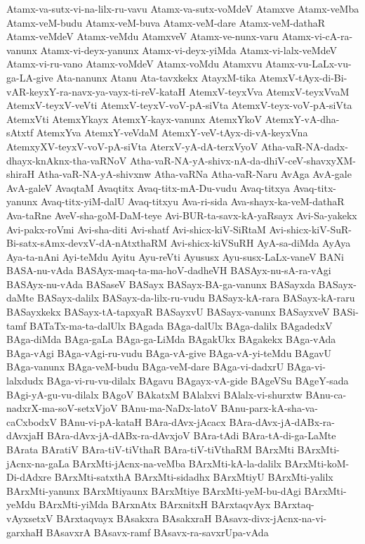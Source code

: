 {Atamx-va-sutx-vi-na-lilx-ru-vavu
Atamx-va-sutx-voMdeV
Atamxve
Atamx-veMba
Atamx-veM-budu
Atamx-veM-buva
Atamx-veM-dare
Atamx-veM-dathaR
Atamx-veMdeV
Atamx-veMdu
AtamxveV
Atamx-ve-nunx-varu
Atamx-vi-cA-ra-vanunx
Atamx-vi-deyx-yanunx
Atamx-vi-deyx-yiMda
Atamx-vi-lalx-veMdeV
Atamx-vi-ru-vano
Atamx-voMdeV
Atamx-voMdu
Atamxvu
Atamx-vu-LaLx-vu-ga-LA-give
Ata-nanunx
Atanu
Ata-tavxkekx
AtayxM-tika
AtemxV-tAyx-di-Bi-vAR-keyxY-ra-navx-ya-vayx-ti-reV-kataH
AtemxV-teyxVva
AtemxV-teyxVvaM
AtemxV-teyxV-veVti
AtemxV-teyxV-voV-pA-siVta
AtemxV-teyx-voV-pA-siVta
AtemxVti
AtemxYkayx
AtemxY-kayx-vanunx
AtemxYkoV
AtemxY-vA-dha-sAtxtf
AtemxYva
AtemxY-veVdaM
AtemxY-veV-tAyx-di-vA-keyxVna
AtemxyXV-teyxV-voV-pA-siVta
AterxV-yA-dA-terxVyoV
Atha-vaR-NA-dadx-dhayx-knAknx-tha-vaRNoV
Atha-vaR-NA-yA-shivx-nA-da-dhiV-ceV-shavxyXM-shiraH
Atha-vaR-NA-yA-shivxnw
Atha-vaRNa
Atha-vaR-Naru
AvAga
AvA-gale
AvA-galeV
AvaqtaM
Avaqtitx
Avaq-titx-mA-Du-vudu
Avaq-titxya
Avaq-titx-yanunx
Avaq-titx-yiM-dalU
Avaq-titxyu
Ava-ri-sida
Ava-shayx-ka-veM-dathaR
Ava-taRne
AveV-sha-goM-DaM-teye
Avi-BUR-ta-savx-kA-yaRsayx
Avi-Sa-yakekx
Avi-pakx-roVmi
Avi-sha-diti
Avi-shatf
Avi-shicx-kiV-SiRtaM
Avi-shicx-kiV-SuR-Bi-satx-sAmx-devxV-dA-nAtxthaRM
Avi-shicx-kiVSuRH
AyA-sa-diMda
AyAya
Aya-ta-nAni
Ayi-teMdu
Ayitu
Ayu-reVti
Ayususx
Ayu-susx-LaLx-vaneV
BANi
BASA-nu-vAda
BASAyx-maq-ta-ma-hoV-dadheVH
BASAyx-nu-sA-ra-vAgi
BASAyx-nu-vAda
BASaseV
BASayx
BASayx-BA-ga-vanunx
BASayxda
BASayx-daMte
BASayx-dalilx
BASayx-da-lilx-ru-vudu
BASayx-kA-rara
BASayx-kA-raru
BASayxkekx
BASayx-tA-tapxyaR
BASayxvU
BASayx-vanunx
BASayxveV
BASi-tamf
BATaTx-ma-ta-dalUlx
BAgada
BAga-dalUlx
BAga-dalilx
BAgadedxV
BAga-diMda
BAga-gaLa
BAga-ga-LiMda
BAgakUkx
BAgakekx
BAga-vAda
BAga-vAgi
BAga-vAgi-ru-vudu
BAga-vA-give
BAga-vA-yi-teMdu
BAgavU
BAga-vanunx
BAga-veM-budu
BAga-veM-dare
BAga-vi-dadxrU
BAga-vi-lalxdudx
BAga-vi-ru-vu-dilalx
BAgavu
BAgayx-vA-gide
BAgeVSu
BAgeY-sada
BAgi-yA-gu-vu-dilalx
BAgoV
BAkatxM
BAlalxvi
BAlalx-vi-shurxtw
BAnu-ca-nadxrX-ma-soV-setxVjoV
BAnu-ma-NaDx-latoV
BAnu-parx-kA-sha-va-caCxbodxV
BAnu-vi-pA-kataH
BAra-dAvx-jAcacx
BAra-dAvx-jA-dABx-ra-dAvxjaH
BAra-dAvx-jA-dABx-ra-dAvxjoV
BAra-tAdi
BAra-tA-di-ga-LaMte
BArata
BAratiV
BAra-tiV-tiVthaR
BAra-tiV-tiVthaRM
BArxMti
BArxMti-jAcnx-na-gaLa
BArxMti-jAcnx-na-veMba
BArxMti-kA-la-dalilx
BArxMti-koM-Di-dAdxre
BArxMti-satxthA
BArxMti-sidadhx
BArxMtiyU
BArxMti-yalilx
BArxMti-yanunx
BArxMtiyaunx
BArxMtiye
BArxMti-yeM-bu-dAgi
BArxMti-yeMdu
BArxMti-yiMda
BArxnAtx
BArxnitxH
BArxtaqvAyx
BArxtaq-vAyxsetxV
BArxtaqvayx
BAsakxra
BAsakxraH
BAsavx-divx-jAcnx-na-vi-garxhaH
BAsavxrA
BAsavx-ramf
BAsavx-ra-savxrUpa-vAda
}
